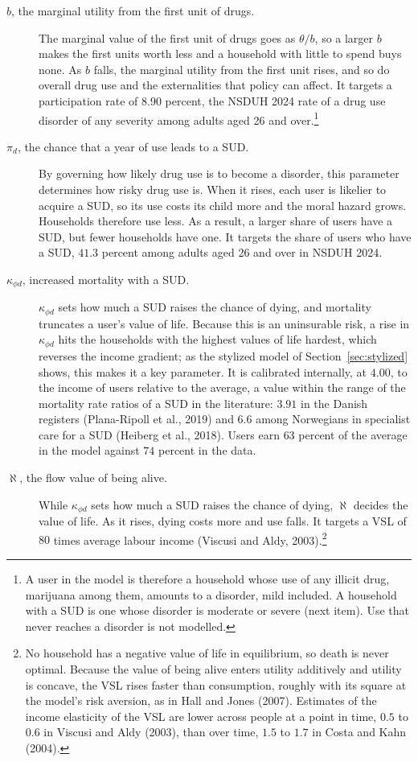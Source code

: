 \documentclass[10pt]{article}
\begin{document}
\begin{description}
\item[$b$, the marginal utility from the first unit of drugs.] The marginal value of the first unit of drugs goes as $\theta/b$, so a larger $b$ makes the first units worth less and a household with little to spend buys none. As $b$ falls, the marginal utility from the first unit rises, and so do overall drug use and the externalities that policy can affect. It targets a participation rate of $8.90$ percent, the NSDUH 2024 rate of a drug use disorder of any severity among adults aged 26 and over.\footnote{A user in the model is therefore a household whose use of any illicit drug, marijuana among them, amounts to a disorder, mild included. A household with a SUD is one whose disorder is moderate or severe (next item). Use that never reaches a disorder is not modelled.}
\item[$\pi_d$, the chance that a year of use leads to a SUD.] By governing how likely drug use is to become a disorder, this parameter determines how risky drug use is. When it rises, each user is likelier to acquire a SUD, so its use costs its child more and the moral hazard grows. Households therefore use less. As a result, a larger share of users have a SUD, but fewer households have one. It targets the share of users who have a SUD, $41.3$ percent among adults aged 26 and over in NSDUH 2024.
\item[$\kappa_{\phi d}$, increased mortality with a SUD.] $\kappa_{\phi d}$ sets how much a SUD raises the chance of dying, and mortality truncates a user's value of life. Because this is an uninsurable risk, a rise in $\kappa_{\phi d}$ hits the households with the highest values of life hardest, which reverses the income gradient; as the stylized model of Section~\ref{sec:stylized} shows, this makes it a key parameter. It is calibrated internally, at $4.00$, to the income of users relative to the average, a value within the range of the mortality rate ratios of a SUD in the literature: $3.91$ in the Danish registers (Plana-Ripoll et al., 2019) and $6.6$ among Norwegians in specialist care for a SUD (Heiberg et al., 2018). Users earn $63$ percent of the average in the model against $74$ percent in the data.
\item[$\aleph$, the flow value of being alive.]   While $\kappa_{\phi d}$ sets how much a SUD raises the chance of dying, $\aleph$ decides the value of life. As it rises, dying costs more and use falls. It targets a VSL of $80$ times average labour income (Viscusi and Aldy, 2003).\footnote{No household has a negative value of life in equilibrium, so death is never optimal. Because the value of being alive enters utility additively and utility is concave, the VSL rises faster than consumption, roughly with its square at the model's risk aversion, as in Hall and Jones (2007). Estimates of the income elasticity of the VSL are lower across people at a point in time, $0.5$ to $0.6$ in Viscusi and Aldy (2003), than over time, $1.5$ to $1.7$ in Costa and Kahn (2004).}
\end{description}
\end{document}
